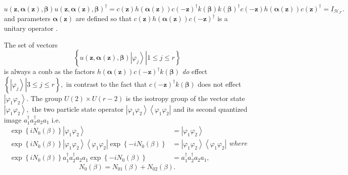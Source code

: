 \documentclass[aps,preprint]{revtex4}%
\begin{document}
\begin{equation}
u\left(  \mathbf{z,\alpha\left(  \mathbf{z}\right)  ,\beta}\right)  u\left(
\mathbf{z,\alpha\left(  \mathbf{z}\right)  ,\beta}\right)  ^{\dagger}=c\left(
\mathbf{z}\right)  h\left(  \mathbf{\alpha}\left(  \mathbf{z}\right)  \right)
c\left(  -\mathbf{z}\right)  ^{\dagger}k\left(  \mathbf{\beta}\right)
k\left(  \mathbf{\beta}\right)  ^{\dagger}c\left(  -\mathbf{z}\right)
h\left(  \mathbf{\alpha}\left(  \mathbf{z}\right)  \right)  c\left(
\mathbf{z}\right)  ^{\dagger}=I_{\mathcal{H}_{\mathcal{F}}}.
\end{equation}
and parameters $\mathbf{\alpha}\left(  \mathbf{z}\right)  $ are defined so
that $c\left(  \mathbf{z}\right)  h\left(  \mathbf{\alpha}\left(
\mathbf{z}\right)  \right)  c\left(  -\mathbf{z}\right)  ^{\dagger}$ is a
unitary operator \cite{Gilmore}.

The set of vectors
\begin{equation}
\left\{  \left.  u\left(  \mathbf{z,\alpha\left(  \mathbf{z}\right)  ,\beta
}\right)  \left\vert \varphi_{j}\right\rangle \right\vert 1\leq j\leq
r\right\}
\end{equation}
is always a conb as the factors $h\left(  \mathbf{\alpha}\left(
\mathbf{z}\right)  \right)  c\left(  -\mathbf{z}\right)  ^{\dagger}k\left(
\mathbf{\beta}\right)  $ \emph{do} effect $\left\{  \left.  \left\vert
\varphi_{j}\right\rangle \right\vert 3\leq j\leq r\right\}  ,$ in contrast to
the fact that $c\left(  -\mathbf{z}\right)  ^{\dagger}k\left(  \mathbf{\beta
}\right)  $ does not effect $\left\vert \varphi_{1}\varphi_{2}\right\rangle .$
The group $U\left(  2\right)  \times U\left(  r-2\right)  $ is the isotropy
group of the vector state $\left\vert \varphi_{1}\varphi_{2}\right\rangle ,$
the two particle state operator $\left\vert \varphi_{1}\varphi_{2}%
\right\rangle \left\langle \varphi_{1}\varphi_{2}\right\vert $ and its second
quantized image $a_{1}^{\dagger}a_{2}^{\dagger}a_{2}a_{1}$ i.e.
\begin{subequations}
\begin{align}
\exp\left\{  iN_{0}\left(  \beta\right)  \right\}  \left\vert \varphi
_{1}\varphi_{2}\right\rangle  &  =\left\vert \varphi_{1}\varphi_{2}%
\right\rangle \\
\exp\left\{  iN_{0}\left(  \beta\right)  \right\}  \left\vert \varphi
_{1}\varphi_{2}\right\rangle \left\langle \varphi_{1}\varphi_{2}\right\vert
\exp\left\{  -iN_{0}\left(  \beta\right)  \right\}   &  =\left\vert
\varphi_{1}\varphi_{2}\right\rangle \left\langle \varphi_{1}\varphi
_{2}\right\vert \\
\exp\left\{  iN_{0}\left(  \beta\right)  \right\}  a_{1}^{\dagger}%
a_{2}^{\dagger}a_{2}a_{1}\exp\left\{  -iN_{0}\left(  \beta\right)  \right\}
&  =a_{1}^{\dagger}a_{2}^{\dagger}a_{2}a_{1},
\end{align}
where
\end{subequations}
\begin{equation}
N_{0}\left(  \beta\right)  =N_{01}\left(  \beta\right)  +N_{02}\left(
\beta\right)  .
\end{equation}
\qquad\qquad\qquad
\end{document}
